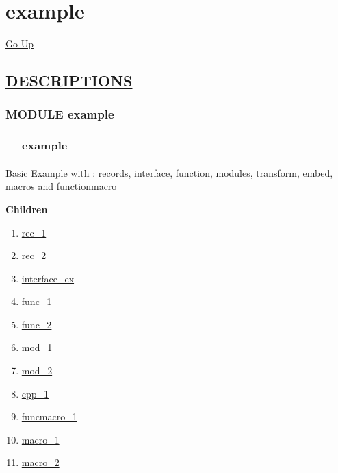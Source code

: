 \chapter*{\color{headfile}
example
}
\hypertarget{ecldoc:toc:example}{}
\hyperlink{ecldoc:toc:root}{Go Up}


\section*{\underline{\textsf{DESCRIPTIONS}}}
\subsection*{\textsf{\colorbox{headtoc}{\color{white} MODULE}
example}}

\hypertarget{ecldoc:example}{}

{\renewcommand{\arraystretch}{1.5}
\begin{tabularx}{\textwidth}{|>{\raggedright\arraybackslash}l|X|}
\hline
\hspace{0pt}\mytexttt{\color{red} } & \textbf{example} \\
\hline
\end{tabularx}
}

\par
Basic Example with : records, interface, function, modules, transform, embed, macros and functionmacro


\textbf{Children}
\begin{enumerate}
\item \hyperlink{ecldoc:example.rec_1}{rec\_1}
\item \hyperlink{ecldoc:example.rec_2}{rec\_2}
\item \hyperlink{ecldoc:example.interface_ex}{interface\_ex}
\item \hyperlink{ecldoc:example.func_1}{func\_1}
\item \hyperlink{ecldoc:example.func_2}{func\_2}
\item \hyperlink{ecldoc:example.mod_1}{mod\_1}
\item \hyperlink{ecldoc:example.mod_2}{mod\_2}
\item \hyperlink{ecldoc:example.cpp_1}{cpp\_1}
\item \hyperlink{ecldoc:example.funcmacro_1}{funcmacro\_1}
\item \hyperlink{ecldoc:example.macro_1}{macro\_1}
\item \hyperlink{ecldoc:example.macro_2}{macro\_2}
\end{enumerate}

